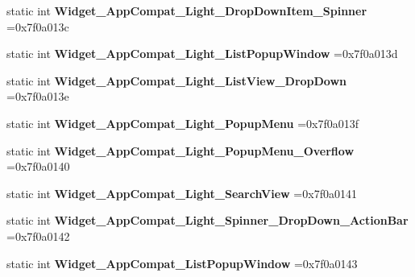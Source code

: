 \begin{DoxyCompactItemize}
static int {\bfseries Widget\+\_\+\+App\+Compat\+\_\+\+Light\+\_\+\+Drop\+Down\+Item\+\_\+\+Spinner} =0x7f0a013c
\item 
\mbox{\label{classandroid_1_1support_1_1v7_1_1recyclerview_1_1R_1_1style_ab0fe3785f441342946d6fcde91bb15ff}} 
static int {\bfseries Widget\+\_\+\+App\+Compat\+\_\+\+Light\+\_\+\+List\+Popup\+Window} =0x7f0a013d
\item 
\mbox{\label{classandroid_1_1support_1_1v7_1_1recyclerview_1_1R_1_1style_aeed0e8123076bc1eab3a04cac8861415}} 
static int {\bfseries Widget\+\_\+\+App\+Compat\+\_\+\+Light\+\_\+\+List\+View\+\_\+\+Drop\+Down} =0x7f0a013e
\item 
\mbox{\label{classandroid_1_1support_1_1v7_1_1recyclerview_1_1R_1_1style_ae530e2127d0cb479bd855e539889db66}} 
static int {\bfseries Widget\+\_\+\+App\+Compat\+\_\+\+Light\+\_\+\+Popup\+Menu} =0x7f0a013f
\item 
\mbox{\label{classandroid_1_1support_1_1v7_1_1recyclerview_1_1R_1_1style_a3e37217230388761233cf65e3404fdfc}} 
static int {\bfseries Widget\+\_\+\+App\+Compat\+\_\+\+Light\+\_\+\+Popup\+Menu\+\_\+\+Overflow} =0x7f0a0140
\item 
\mbox{\label{classandroid_1_1support_1_1v7_1_1recyclerview_1_1R_1_1style_a4861e1897eb0c2b6e549334fa48b658d}} 
static int {\bfseries Widget\+\_\+\+App\+Compat\+\_\+\+Light\+\_\+\+Search\+View} =0x7f0a0141
\item 
\mbox{\label{classandroid_1_1support_1_1v7_1_1recyclerview_1_1R_1_1style_a9e47a1c53823127c5f998be644019a1a}} 
static int {\bfseries Widget\+\_\+\+App\+Compat\+\_\+\+Light\+\_\+\+Spinner\+\_\+\+Drop\+Down\+\_\+\+Action\+Bar} =0x7f0a0142
\item 
\mbox{\label{classandroid_1_1support_1_1v7_1_1recyclerview_1_1R_1_1style_adb5447e80892199ae905a068f34e2edf}} 
static int {\bfseries Widget\+\_\+\+App\+Compat\+\_\+\+List\+Popup\+Window} =0x7f0a0143

\end{DoxyCompactItemize}
